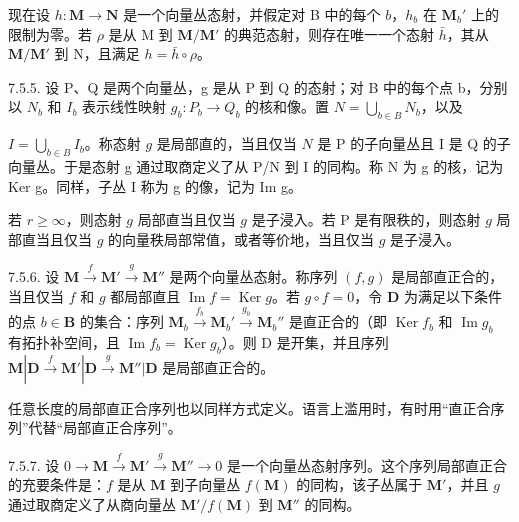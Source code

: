 现在设 \(h: \mathbf{M} \to \mathbf{N}\) 是一个向量丛态射，并假定对 B 中的每个 \(b\)，\(h_b\) 在 \(\mathbf{M}_b'\) 上的限制为零。若 \(\rho\) 是从 M 到 \(\mathbf{M}/\mathbf{M}'\) 的典范态射，则存在唯一一个态射 \(\bar{h}\)，其从 \(\mathbf{M}/\mathbf{M}'\) 到 N，且满足 \(h = \bar{h} \circ \rho\)。

7.5.5. 设 P、Q 是两个向量丛，g 是从 P 到 Q 的态射；对 B 中的每个点 b，分别以 \(N_{b}\) 和 \(I_{b}\) 表示线性映射 \(g_{b}:P_{b}\to Q_{b}\) 的核和像。置 \(N=\bigcup_{b\in B}N_{b}\)，以及

\(I = \bigcup_{b \in B} I_b\)。称态射 \(g\) 是局部直的，当且仅当 \(N\) 是 P 的子向量丛且 I 是 Q 的子向量丛。于是态射 g 通过取商定义了从 P/N 到 I 的同构。称 N 为 g 的核，记为 Ker g。同样，子丛 I 称为 g 的像，记为 Im g。

若 \(r \geqslant \infty\)，则态射 \(g\) 局部直当且仅当 \(g\) 是子浸入。若 P 是有限秩的，则态射 \(g\) 局部直当且仅当 \(g\) 的向量秩局部常值，或者等价地，当且仅当 \(g\) 是子浸入。

7.5.6. 设 \(\mathbf{M} \xrightarrow{f} \mathbf{M}' \xrightarrow{g} \mathbf{M}''\) 是两个向量丛态射。称序列 \((f, g)\) 是局部直正合的，当且仅当 \(f\) 和 \(g\) 都局部直且 \(\operatorname{Im} f = \operatorname{Ker} g\)。若 \(g \circ f = 0\)，令 \(\mathbf{D}\) 为满足以下条件的点 \(b \in \mathbf{B}\) 的集合：序列 \(\mathbf{M}_b \xrightarrow{f_b} \mathbf{M}_b' \xrightarrow{g_b} \mathbf{M}_b''\) 是直正合的（即 \(\operatorname{Ker} f_b\) 和 \(\operatorname{Im} g_b\) 有拓扑补空间，且 \(\operatorname{Im} f_b = \operatorname{Ker} g_b\)）。则 D 是开集，并且序列 \(\mathbf{M}|\mathbf{D} \xrightarrow{f} \mathbf{M}'|\mathbf{D} \xrightarrow{g} \mathbf{M}''|\mathbf{D}\) 是局部直正合的。

任意长度的局部直正合序列也以同样方式定义。语言上滥用时，有时用“直正合序列”代替“局部直正合序列”。

7.5.7. 设 \(0 \to \mathbf{M} \xrightarrow{f} \mathbf{M}' \xrightarrow{g} \mathbf{M}'' \to 0\) 是一个向量丛态射序列。这个序列局部直正合的充要条件是：\(f\) 是从 \(\mathbf{M}\) 到子向量丛 \(f(\mathbf{M})\) 的同构，该子丛属于 \(\mathbf{M}'\)，并且 \(g\) 通过取商定义了从商向量丛 \(\mathbf{M}'/f(\mathbf{M})\) 到 \(\mathbf{M}''\) 的同构。

